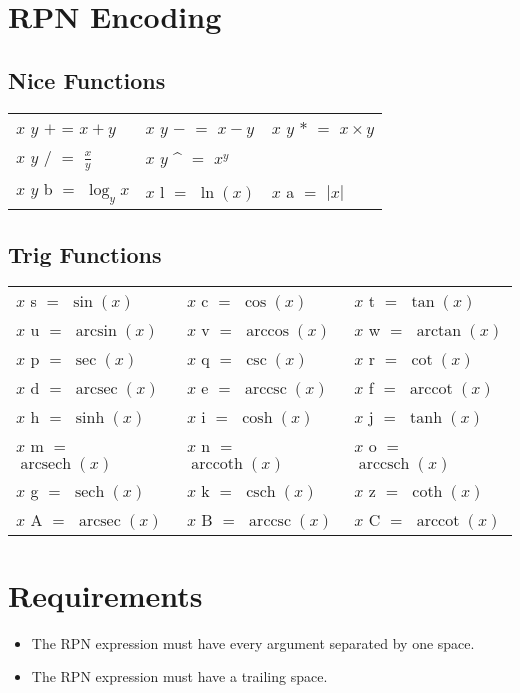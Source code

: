 \documentclass{article}
\DeclareMathOperator{\arcsec}{arcsec}
\DeclareMathOperator{\arccot}{arccot}
\DeclareMathOperator{\arccsc}{arccsc}
\DeclareMathOperator{\arcsinh}{arcsech}
\DeclareMathOperator{\arccosh}{arccoth}
\DeclareMathOperator{\arctanh}{arccsch}
\DeclareMathOperator{\sech}{sech}
\DeclareMathOperator{\csch}{csch}
\begin{document}
\doublespacing
\section{RPN Encoding}
\subsection{Nice Functions}
\begin{tabular}{lll}
$x$ $y$ $+$ = $x + y$ & $x$ $y$ $-$ $=$ $x - y$ & $x$ $y$ $*$ $=$ $x \times y$\\
$x$ $y$ $/$ $=$ $\frac{x}{y}$&$x$ $y$ \^{} $=$ $x^y$&\\
$x$ $y$ b $=$ $\log_y{x}$&$x$ l $=$ $\ln(x)$& $x$ a $=$ $|x|$\\
\end{tabular}
\subsection{Trig Functions}
\begin{tabular}{lll}
$x$ s $=$ $\sin(x)$&$x$ c $=$ $\cos(x)$& $x$ t $=$ $\tan(x)$\\
$x$ u $=$ $\arcsin(x)$&$x$ v $=$ $\arccos(x)$& $x$ w $=$ $\arctan(x)$\\
$x$ p $=$ $\sec(x)$&$x$ q $=$ $\csc(x)$& $x$ r $=$ $\cot(x)$\\
$x$ d $=$ $\arcsec(x)$&$x$ e $=$ $\arccsc(x)$& $x$ f $=$ $\arccot(x)$\\
$x$ h $=$ $\sinh(x)$&$x$ i $=$ $\cosh(x)$& $x$ j $=$ $\tanh(x)$\\
$x$ m $=$ $\arcsinh(x)$&$x$ n $=$ $\arccosh(x)$& $x$ o $=$ $\arctanh(x)$\\
$x$ g $=$ $\sech(x)$&$x$ k $=$ $\csch(x)$& $x$ z $=$ $\coth(x)$\\
$x$ A $=$ $\arcsec(x)$&$x$ B $=$ $\arccsc(x)$& $x$ C $=$ $\arccot(x)$\\
\end{tabular}
\section{Requirements}{
\begin{itemize}
\item{The RPN expression must have every argument separated by one space.}
\item{The RPN expression must have a trailing space.}
\end{itemize}
}
\end{document}
